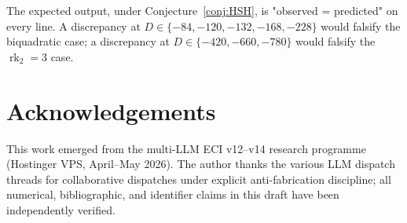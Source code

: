 \documentclass[11pt,a4paper]{amsart}
\theoremstyle{definition}
\DeclareMathOperator{\rk}{rk}
\newcommand{\rktwo}{\rk_{2}}
\begin{document}
The expected output, under Conjecture~\ref{conj:HSH}, is "observed = predicted" on every
line. A discrepancy at $D \in \{-84, -120, -132, -168, -228\}$ would falsify the
biquadratic case; a discrepancy at $D \in \{-420, -660, -780\}$ would falsify the
$\rktwo = 3$ case.

\section*{Acknowledgements}

This work emerged from the multi-LLM ECI v12--v14 research programme (Hostinger VPS,
April--May 2026). The author thanks the various LLM dispatch threads for collaborative dispatches under explicit
anti-fabrication discipline; all numerical, bibliographic, and identifier claims in this
draft have been independently verified.
\end{document}
